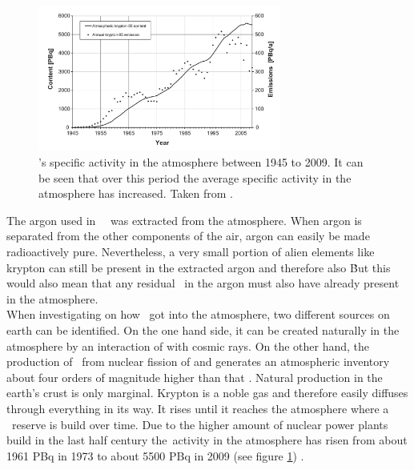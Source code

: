 \documentclass[encoding=utf8,british]{tumphthesis}
\begin{document}
\begin{figure}[t!]
	\centering
	\ifmakefigures%
	\includegraphics[width=80mm]{./Bilder/Kr85Aenderung.png}
	\fi%
	\caption{
	    \Kr's specific activity in the atmosphere between 1945 to 2009. It can be seen that over this period the average specific activity in the atmosphere has increased. 
		Taken from \cite{ahlswede_update_2013}.
	}
    \label{fig:Kr85Aenderung}
\end{figure}

The argon used in \gerda\ \PII\ was extracted from the atmosphere.
When argon is separated from the other components of the air, argon can easily be made radioactively pure.
Nevertheless, a very small portion of alien elements like krypton can still be present in the extracted argon and therefore also \Kr\.  
But this would also mean that any residual \Kr\ in the argon must also have already present in the atmosphere.
\\

When investigating on how  \Kr\ got into the atmosphere, two different sources on earth can be identified.
On the one hand side, it can be created naturally in the atmosphere by an interaction of  with cosmic rays.
On the other hand, the production of \Kr\ from nuclear fission of  and  generates an atmospheric inventory about four orders of magnitude higher than that \cite{winger_new_2005}.
Natural production in the earth's crust is only marginal.
Krypton is a noble gas and therefore easily diffuses through everything in its way.
It rises until it reaches the atmosphere where a \Kr\ reserve is build over time.  
Due to the higher amount of nuclear power plants build in the last half century the\Kr\ activity in the atmosphere has risen from about 1961 PBq in 1973 \cite{telegadas_atmospheric_1975} to about 5500 PBq in 2009 (see figure \ref{fig:Kr85Aenderung}) \cite{ahlswede_update_2013}.
\\

\end{document}
